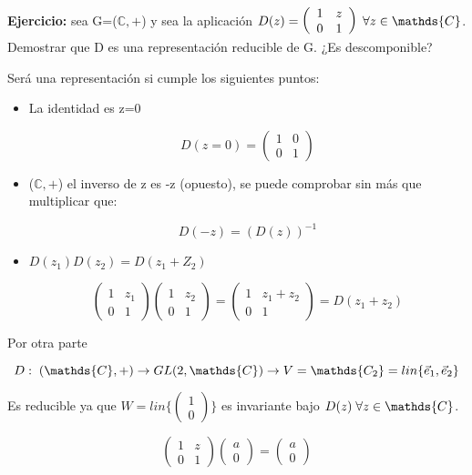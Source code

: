 \documentclass{article}
\begin{document}
\textbf{Ejercicio:} sea G=($\mathds{C},+$) y sea la aplicación $D(z)=\left ( \begin{array}{cc}
1 & z \\
0 & 1
\end{array} \right ) \hspace{0.1cm} \forall z\in \mathds{C}$. Demostrar que D es una representación reducible de G. ¿Es descomponible?

\bigskip
Será una representación si cumple los siguientes puntos:

\begin{itemize}
\item La identidad es z=0

$$D(z=0)=\left ( \begin{array}{cc}
1 &  0\\
0 & 1
\end{array} \right )$$

\item  ($\mathds{C},+$) el inverso de z es -z (opuesto), se puede comprobar sin más que multiplicar que:

$$D(-z)=(D(z))^{-1}$$

\item $D(z_1)D(z_2)=D(z_1+Z_2)$

$$\left ( \begin{array}{cc}
1 & z_1 \\
0 & 1
\end{array}\right)\left ( \begin{array}{cc}
1 & z_2 \\
0 & 1
\end{array}\right)=\left ( \begin{array}{cc}
1 & z_1 +z_2 \\
0 & 1
\end{array}\right)=D(z_1+z_2)$$
\end{itemize}

Por otra parte

$$D: \hspace{0.1cm} (\mathds{C},+)\to GL(2, \mathds{C}) \to V=\mathds{C_2}=lin \lbrace \Vec{e}_1,\Vec{e}_2\rbrace$$

Es reducible ya que $W= lin \lbrace \left ( \begin{array}{c}
1  \\
0
\end{array}\right) \rbrace$ es invariante bajo $D(z)\hspace{0.1cm} \forall z \in \mathds{C}$.

$$\left ( \begin{array}{cc}
1 & z \\
0 & 1
\end{array}\right) \left( \begin{array}{c}
a  \\
0
\end{array}\right)=  \left( \begin{array}{c}
a  \\
0
\end{array}\right)$$
\end{document}

